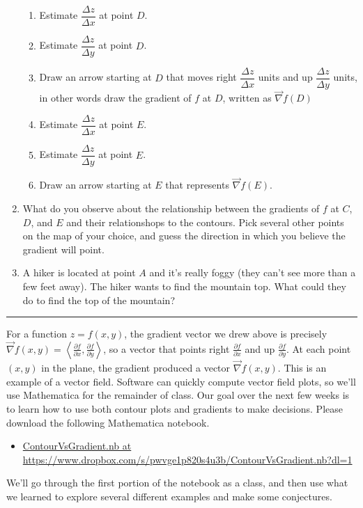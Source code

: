 \documentclass[letterpaper,oneside]{book}%
\begin{document}
\begin{enumerate}
\begin{enumerate}
  \item  Estimate $\dfrac{\Delta z}{\Delta x}$ at point $D$. 
  \item  Estimate $\dfrac{\Delta z}{\Delta y}$ at point $D$. 
  \item  Draw an arrow starting at $D$ that moves right $\dfrac{\Delta z}{\Delta x}$ units and up $\dfrac{\Delta z}{\Delta y}$ units, in other words draw the gradient of $f$ at $D$, written as $\vec \nabla f(D)$
  \item  Estimate $\dfrac{\Delta z}{\Delta x}$ at point $E$. 
  \item  Estimate $\dfrac{\Delta z}{\Delta y}$ at point $E$. 
  \item  Draw an arrow starting at $E$ that represents $\vec \nabla f(E)$.
 \end{enumerate}
 \item What do you observe about the relationship between the gradients of $f$ at $C$, $D$, and $E$ and their relationshops to the contours. Pick several other points on the map of your choice, and guess the direction in which you believe the gradient will point. 
 \item A hiker is located at point $A$ and it's really foggy (they can't see more than a few feet away).  The hiker wants to find the mountain top. What could they do to find the top of the mountain?
\end{enumerate}
\hrule
\vspace{.2in} 

For a function $z=f(x,y)$, the gradient vector we drew above is precisely 
$\vec \nabla f(x,y) = \left<\frac{\partial f}{\partial x},\frac{\partial f}{\partial y}\right>$, so a vector that points right $\frac{\partial f}{\partial x}$ and up $\frac{\partial f}{\partial y}$.   
At each point $(x,y)$ in the plane, the gradient produced a vector $\vec \nabla f(x,y)$. 
This is an example of a vector field.  
Software can quickly compute vector field plots, so we'll use Mathematica for the remainder of class. 
Our goal over the next few weeks is to learn how to use both contour plots and gradients to make decisions. Please download the following Mathematica notebook. 
\begin{itemize}
 \item \href{https://www.dropbox.com/s/pwvge1p820s4u3b/ContourVsGradient.nb?dl=1}{ContourVsGradient.nb at https://www.dropbox.com/s/pwvge1p820s4u3b/ContourVsGradient.nb?dl=1}
\end{itemize}
We'll go through the first portion of the notebook as a class, and then use what we learned to explore several different examples and make some conjectures. 
\end{document}

